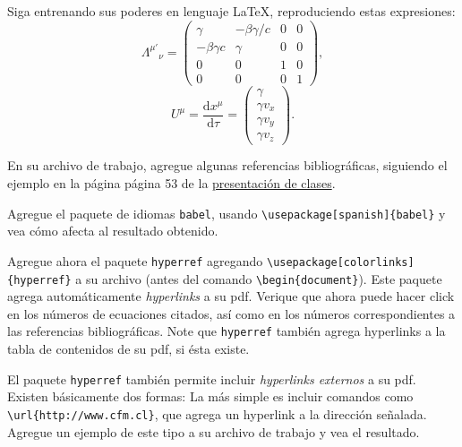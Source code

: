 \documentclass[11pt]{exam}
\begin{document}
\begin{questions}
\item Siga entrenando sus poderes en lenguaje \LaTeX, reproduciendo estas expresiones:
\begin{equation}
\Lambda^{\mu'}{}_\nu = \begin{pmatrix}
\gamma & -\beta\gamma/c & 0 & 0\\
-\beta\gamma c & \gamma & 0 & 0\\
0 & 0 & 1 & 0\\
0 & 0 & 0 & 1 \end{pmatrix},
\end{equation}
\begin{equation}
U^\mu = \frac{\text{d}x^\mu}{\text{d}\tau} =
\begin{pmatrix} \gamma \\ \gamma v_x \\ \gamma v_y \\ \gamma v_z \end{pmatrix}.
\end{equation}

\item En su archivo de trabajo, agregue algunas referencias bibliográficas, siguiendo el ejemplo en la página página 53 de la \href{https://udec.instructure.com/courses/51022/pages/latex-pdf-presentacion?module_item_id=1904611}{presentación de clases}.

\item Agregue el paquete de idiomas \texttt{babel}, usando \verb|\usepackage[spanish]{babel}| y vea cómo afecta al resultado obtenido.

\item Agregue ahora el paquete \texttt{hyperref} agregando 
\verb|\usepackage[colorlinks]{hyperref}| a su archivo (antes del comando \verb|\begin{document}|). Este paquete agrega automáticamente \textit{hyperlinks} a su pdf. Verique que ahora puede hacer click en los números de ecuaciones citados, así como en los números correspondientes a las referencias bibliográficas. Note que \texttt{hyperref} también agrega hyperlinks a la tabla de contenidos de su pdf, si ésta existe.

\item El paquete \texttt{hyperref} también permite incluir \textit{hyperlinks externos} a su pdf. Existen básicamente dos formas: La más simple es incluir comandos como \verb|\url{http://www.cfm.cl}|, que agrega un hyperlink a la dirección señalada. Agregue un ejemplo de este tipo a su archivo de trabajo y vea el resultado.


\end{questions}
\end{document}
